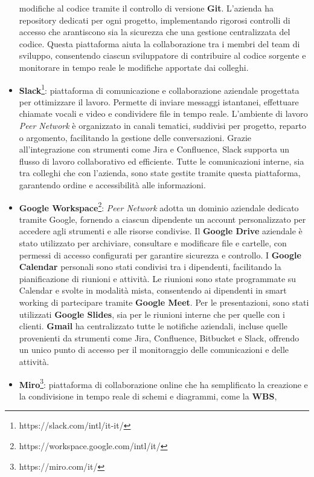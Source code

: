 \begin{itemize}
    modifiche al codice tramite il controllo di versione \textbf{Git}. L'azienda ha repository dedicati per ogni progetto, implementando rigorosi controlli di accesso che
    arantiscono sia la sicurezza che una gestione centralizzata del codice. Questa piattaforma aiuta la collaborazione tra i membri del team di sviluppo, consentendo
    ciascun sviluppatore di contribuire al codice sorgente e monitorare in tempo reale le modifiche apportate dai colleghi.
    \item \textbf{Slack}\footnote{https://slack.com/intl/it-it/}: piattaforma di comunicazione e collaborazione aziendale progettata per ottimizzare il lavoro. Permette di inviare messaggi istantanei, effettuare
    chiamate vocali e video e condividere file in tempo reale. L’ambiente di lavoro \textit{Peer Network} è organizzato in canali tematici, suddivisi per progetto, reparto o argomento,
    facilitando la gestione delle conversazioni. Grazie all’integrazione con strumenti come Jira e Confluence, Slack supporta un flusso di lavoro collaborativo ed efficiente.
    Tutte le comunicazioni interne, sia tra colleghi che con l’azienda, sono state gestite tramite questa piattaforma, garantendo ordine e accessibilità alle informazioni.
    \item \textbf{Google Workspace}\footnote{https://workspace.google.com/intl/it/}: \textit{Peer Network} adotta un dominio aziendale dedicato tramite Google, fornendo a ciascun dipendente un account personalizzato
    per accedere agli strumenti e alle risorse condivise. Il \textbf{Google Drive} aziendale è stato utilizzato per archiviare, consultare e modificare file e cartelle, con permessi
    di accesso configurati per garantire sicurezza e controllo. I \textbf{Google Calendar} personali sono stati condivisi tra i dipendenti, facilitando la pianificazione di riunioni
    e attività. Le riunioni sono state programmate su Calendar e svolte in modalità mista, consentendo ai dipendenti in smart working di partecipare tramite \textbf{Google Meet}.
    Per le presentazioni, sono stati utilizzati \textbf{Google Slides}, sia per le riunioni interne che per quelle con i clienti. \textbf{Gmail} ha centralizzato tutte le notifiche aziendali,
    incluse quelle provenienti da strumenti come Jira, Confluence, Bitbucket e Slack, offrendo un unico punto di accesso per il monitoraggio delle comunicazioni e delle attività.
    \item \textbf{Miro}\footnote{https://miro.com/it/}: piattaforma di collaborazione online che ha semplificato la creazione e la condivisione in tempo reale di schemi e diagrammi, come la \textbf{\ac{WBS}},

\end{itemize}
